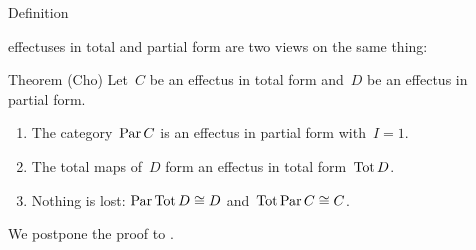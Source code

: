 \documentclass[b]{subfiles}
\begin{document}
\begin{parsec}
\begin{point}{Definition}
\begin{point}
    effectuses in total and partial form are two views
    on the same thing: \cite{kentapartial,introeff}
\end{point}
\end{point}
\begin{point}{Theorem (Cho)}%
Let~$C$ be an effectus in total form
and~$D$ be an effectus in partial form.
\begin{enumerate}
\item
The category~$\operatorname{Par} C$ is an effectus in partial form
        with~$I = 1$.
\item
The total maps of~$D$ form an effectus in total form~$\operatorname{Tot} D$.
\item
    Nothing is lost:
    $\operatorname{Par} \operatorname{Tot} D \cong D$ and~$\operatorname{Tot} \operatorname{Par} C \cong C$.
\end{enumerate}
\begin{point}%
We postpone the proof to .
\end{point}
\end{point}
\end{parsec}
\end{document}
